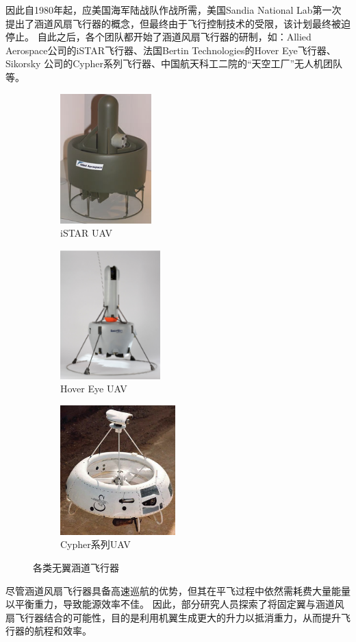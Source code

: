 因此自1980年起，应美国海军陆战队作战所需，美国Sandia National Lab第一次提出了涵道风扇飞行器的概念，但最终由于飞行控制技术的受限，该计划最终被迫停止。
自此之后，各个团队都开始了涵道风扇飞行器的研制，如：Allied Aerospace公司的iSTAR飞行器、法国Bertin Technologies的Hover Eye飞行器、Sikorsky
公司的Cypher系列飞行器、中国航天科工二院的“天空工厂”无人机团队等。
\begin{figure}[ht]
    \centering
    \begin{subfigure}[b]{0.32\textwidth}
      \centering
      \includegraphics[height=5cm]{figure/chapter1/istar.png}
      \caption{iSTAR UAV}
      \label{fig:image1}
    \end{subfigure}
    \hfill %
    \begin{subfigure}[b]{0.32\textwidth}
      \centering
      \includegraphics[height=5cm]{figure/chapter1/hovereye.png}
      \caption{Hover Eye UAV}
      \label{fig:image2}
    \end{subfigure}
    \hfill %
    \begin{subfigure}[b]{0.32\textwidth}
      \centering
      \includegraphics[height=5cm]{figure/chapter1/cypher.png}
      \caption{Cypher系列UAV}
      \label{fig:image3}
    \end{subfigure}
    \caption{各类无翼涵道飞行器}
    \label{fig:nowinguav}
\end{figure}
尽管涵道风扇飞行器具备高速巡航的优势，但其在平飞过程中依然需耗费大量能量以平衡重力，导致能源效率不佳。
因此，部分研究人员探索了将固定翼与涵道风扇飞行器结合的可能性，目的是利用机翼生成更大的升力以抵消重力，从而提升飞行器的航程和效率。

